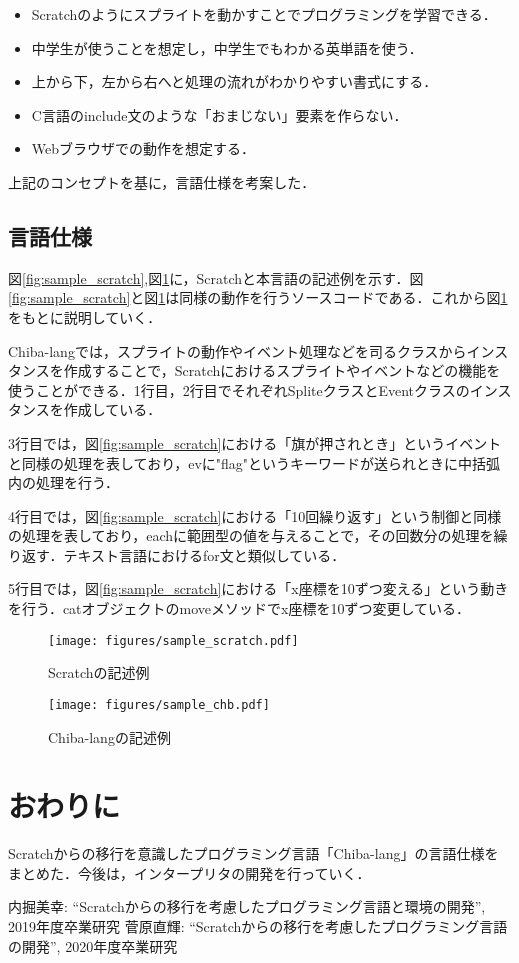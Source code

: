 \documentclass[twocolumn,10pt,a4j]{ltjsarticle}
\begin{document}
\begin{itemize}
\item[(1)] Scratchのようにスプライトを動かすことでプログラミングを学習できる．
\item[(2)] 中学生が使うことを想定し，中学生でもわかる英単語を使う．
\item[(3)] 上から下，左から右へと処理の流れがわかりやすい書式にする．
\item[(4)] C言語のinclude文のような「おまじない」要素を作らない．
\item[(5)] Webブラウザでの動作を想定する．
\end{itemize}

上記のコンセプトを基に，言語仕様を考案した．

\subsection{言語仕様}
図\ref{fig:sample_scratch},図\ref{fig:sample_chb}に，Scratchと本言語の記述例を示す．図\ref{fig:sample_scratch}と図\ref{fig:sample_chb}は同様の動作を行うソースコードである．これから図\ref{fig:sample_chb}をもとに説明していく．

Chiba-langでは，スプライトの動作やイベント処理などを司るクラスからインスタンスを作成することで，Scratchにおけるスプライトやイベントなどの機能を使うことができる．1行目，2行目でそれぞれSpliteクラスとEventクラスのインスタンスを作成している．

3行目では，図\ref{fig:sample_scratch}における「旗が押されとき」というイベントと同様の処理を表しており，evに"flag"というキーワードが送られときに中括弧内の処理を行う．

4行目では，図\ref{fig:sample_scratch}における「10回繰り返す」という制御と同様の処理を表しており，eachに範囲型の値を与えることで，その回数分の処理を繰り返す．テキスト言語におけるfor文と類似している．

5行目では，図\ref{fig:sample_scratch}における「x座標を10ずつ変える」という動きを行う．catオブジェクトのmoveメソッドでx座標を10ずつ変更している．

\begin{figure}[h]
  \begin{minipage}[b]{0.5\linewidth}
    \centering
    \texttt{[image: figures/sample\_scratch.pdf]}
    \caption{Scratchの記述例}
    \label{fig:sample_scratch}
  \end{minipage}
  \begin{minipage}[b]{0.5\linewidth}
    \centering
    \texttt{[image: figures/sample\_chb.pdf]}
    \caption{Chiba-langの記述例}
    \label{fig:sample_chb}
  \end{minipage}
\end{figure}


\section{おわりに}
Scratchからの移行を意識したプログラミング言語「Chiba-lang」の言語仕様をまとめた．今後は，インタープリタの開発を行っていく．

\begin{thebibliography}{99}
 内掘美幸: ``Scratchからの移行を考慮したプログラミング言語と環境の開発'', 2019年度卒業研究
 菅原直輝: ``Scratchからの移行を考慮したプログラミング言語の開発'', 2020年度卒業研究
\end{thebibliography}
\end{document}
